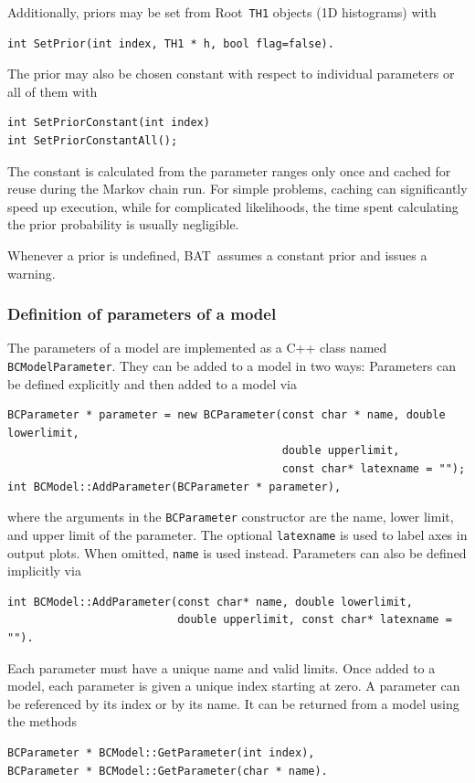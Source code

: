\documentclass[11pt, a4paper]{article}
\newcommand{\bat}{{\sc BAT}}
\newcommand{\Root}{{\sc Root}}
\newcommand{\code}[1]{\texttt{#1}}
\begin{document}
Additionally, priors may be set from \Root\ \code{TH1} objects (1D
histograms) with
\begin{verbatim}
int SetPrior(int index, TH1 * h, bool flag=false).
\end{verbatim}
%

The prior may also be chosen constant with respect to individual
parameters or all of them with
%
\begin{verbatim}
int SetPriorConstant(int index)
int SetPriorConstantAll();
\end{verbatim}
%
The constant is calculated from the parameter ranges only once and
cached for reuse during the Markov chain run. For simple problems,
caching can significantly speed up execution, while for complicated
likelihoods, the time spent calculating the prior probability is
usually negligible.

Whenever a prior is undefined, \bat\ assumes a constant prior and
issues a warning.


\subsubsection{Definition of parameters of a model}
\label{subsubsection:parameters}

The parameters of a model are implemented as a C++ class named
\verb|BCModelParameter|. They can be added to a model in two ways:
Parameters can be defined explicitly and then added to a model via
%
\begin{verbatim}
BCParameter * parameter = new BCParameter(const char * name, double lowerlimit,
                                          double upperlimit,
                                          const char* latexname = "");
int BCModel::AddParameter(BCParameter * parameter),
\end{verbatim}
%
where the arguments in the \code{BCParameter} constructor are the name, lower
limit, and upper limit of the parameter. The optional \verb|latexname| is used
to label axes in output plots. When omitted, \verb|name| is used instead.
Parameters can also be defined implicitly via
%
\begin{verbatim}
int BCModel::AddParameter(const char* name, double lowerlimit,
                          double upperlimit, const char* latexname = "").
\end{verbatim}

Each parameter must have a unique name and valid limits. Once added to
a model, each parameter is given a unique index starting at zero. A
parameter can be referenced by its index or by its name. It can be
returned from a model using the methods
%
\begin{verbatim}
BCParameter * BCModel::GetParameter(int index),
BCParameter * BCModel::GetParameter(char * name).
\end{verbatim}
\end{document}
